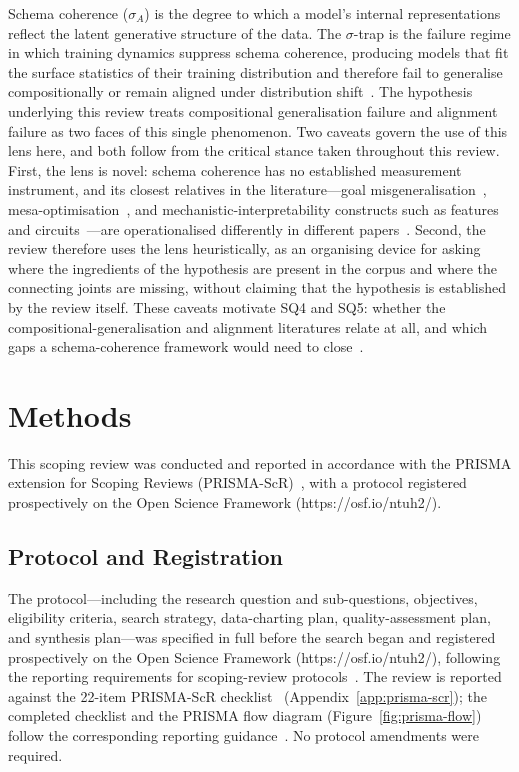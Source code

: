 Schema coherence ($\sigma_A$) is the degree to which a model's internal representations reflect the latent generative structure of the data. The $\sigma$-trap is the failure regime in which training dynamics suppress schema coherence, producing models that fit the surface statistics of their training distribution and therefore fail to generalise compositionally or remain aligned under distribution shift~\cite{amsyar2026sigma}. The hypothesis underlying this review treats compositional generalisation failure and alignment failure as two faces of this single phenomenon. Two caveats govern the use of this lens here, and both follow from the critical stance taken throughout this review. First, the lens is novel: schema coherence has no established measurement instrument, and its closest relatives in the literature---goal misgeneralisation~\cite{langosco2022goal}, mesa-optimisation~\cite{hubinger2019risks}, and mechanistic-interpretability constructs such as features and circuits~\cite{bereska2024mechanistic}---are operationalised differently in different papers~\cite{amodei2016concrete,huvard2023notion}. Second, the review therefore uses the lens heuristically, as an organising device for asking where the ingredients of the hypothesis are present in the corpus and where the connecting joints are missing, without claiming that the hypothesis is established by the review itself. These caveats motivate SQ4 and SQ5: whether the compositional-generalisation and alignment literatures relate at all, and which gaps a schema-coherence framework would need to close~\cite{amsyar2026sigma,huvard2023notion}.

\section{Methods}\label{sec:methods}

This scoping review was conducted and reported in accordance with the PRISMA extension for Scoping Reviews (PRISMA-ScR)~\cite{tricco2018prismascr,arksey2005scoping,levac2010scoping}, with a protocol registered prospectively on the Open Science Framework (https://osf.io/ntuh2/).

\subsection{Protocol and Registration}
The protocol---including the research question and sub-questions, objectives, eligibility criteria, search strategy, data-charting plan, quality-assessment plan, and synthesis plan---was specified in full before the search began and registered prospectively on the Open Science Framework (https://osf.io/ntuh2/), following the reporting requirements for scoping-review protocols~\cite{arksey2005scoping,levac2010scoping,shamseer2015prismap,tricco2018prismascr}. The review is reported against the 22-item PRISMA-ScR checklist~\cite{tricco2018prismascr} (Appendix~\ref{app:prisma-scr}); the completed checklist and the PRISMA flow diagram (Figure~\ref{fig:prisma-flow}) follow the corresponding reporting guidance~\cite{page2021prisma2020}. No protocol amendments were required.

